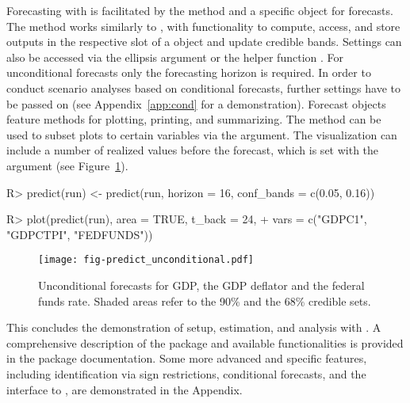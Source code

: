 \documentclass[article,nojss]{jss} %
\begin{document}
Forecasting with  is facilitated by the  method and a specific object for forecasts.
The method works similarly to , with functionality to compute, access, and store outputs in the respective slot of a  object and update credible bands.
Settings can also be accessed via the ellipsis argument or the helper function . For unconditional forecasts only the forecasting horizon is required. In order to conduct scenario analyses based on conditional forecasts, further settings have to be passed on (see Appendix~\ref{app:cond} for a demonstration).
Forecast objects feature methods for plotting, printing, and summarizing. The  method can be used to subset plots to certain variables via the  argument. The visualization can include a number of realized values before the forecast, which is set with the argument  (see Figure~\ref{fig:predict_unconditional}).

\begin{Schunk}
\begin{Sinput}
R> predict(run) <- predict(run, horizon = 16, conf_bands = c(0.05, 0.16))
\end{Sinput}
\end{Schunk}
\begin{Schunk}
\begin{Sinput}
R> plot(predict(run), area = TRUE, t_back = 24,
+    vars = c("GDPC1", "GDPCTPI", "FEDFUNDS"))
\end{Sinput}
\end{Schunk}

\begin{figure}[ht]
  \centering
  \texttt{[image: fig-predict\_unconditional.pdf]}
  \caption{Unconditional forecasts for GDP, the GDP deflator and the federal funds rate. Shaded areas refer to the 90\% and the 68\% credible sets.}
  \label{fig:predict_unconditional}
\end{figure}

This concludes the demonstration of setup, estimation, and analysis with . A comprehensive description of the package and available functionalities is provided in the package documentation. Some more advanced and specific features, including identification via sign restrictions, conditional forecasts, and the interface to , are demonstrated in the Appendix.


\end{document}
